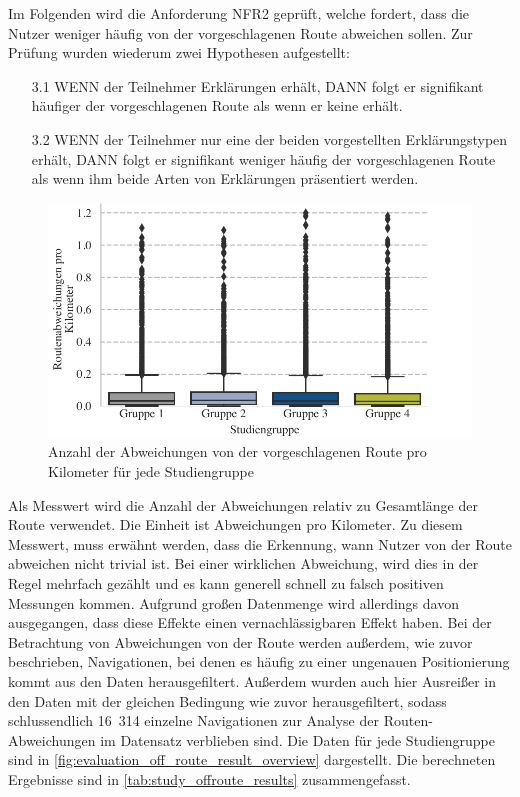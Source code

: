 Im Folgenden wird die Anforderung NFR2 geprüft, welche fordert, dass die Nutzer weniger häufig von der vorgeschlagenen Route abweichen sollen. Zur Prüfung wurden wiederum zwei Hypothesen aufgestellt:

\begin{enumerate}
    \item[3.1] WENN der Teilnehmer Erklärungen erhält, DANN folgt er signifikant häufiger der vorgeschlagenen Route als wenn er keine erhält.
    \item[3.2] WENN der Teilnehmer nur eine der beiden vorgestellten Erklärungstypen erhält, DANN folgt er signifikant weniger häufig der vorgeschlagenen Route als wenn ihm beide Arten von Erklärungen präsentiert werden.
\end{enumerate}

\begin{figure}[htb!]
    \centering
    \includegraphics[width=\textwidth]{contents/06_model_evaluation/02_evaluation/res/off_route_result_overview.pdf}
    \caption{Anzahl der Abweichungen von der vorgeschlagenen Route pro Kilometer für jede Studiengruppe}
    \label{fig:evaluation_off_route_result_overview}
\end{figure}

Als Messwert wird die Anzahl der Abweichungen relativ zu Gesamtlänge der Route verwendet. Die Einheit ist Abweichungen pro Kilometer. Zu diesem Messwert, muss erwähnt werden, dass die Erkennung, wann Nutzer von der Route abweichen nicht trivial ist. Bei einer wirklichen Abweichung, wird dies in der Regel mehrfach gezählt und es kann generell schnell zu falsch positiven Messungen kommen. Aufgrund großen Datenmenge wird allerdings davon ausgegangen, dass diese Effekte einen vernachlässigbaren Effekt haben. Bei der Betrachtung von Abweichungen von der Route werden außerdem, wie zuvor beschrieben, Navigationen, bei denen es häufig zu einer ungenauen Positionierung kommt aus den Daten herausgefiltert. Außerdem wurden auch hier Ausreißer in den Daten mit der gleichen Bedingung wie zuvor herausgefiltert, sodass schlussendlich 16~314 einzelne Navigationen zur Analyse der Routen-Abweichungen im Datensatz verblieben sind. Die Daten für jede Studiengruppe sind in \autoref{fig:evaluation_off_route_result_overview} dargestellt. Die berechneten Ergebnisse sind in \autoref{tab:study_offroute_results} zusammengefasst.

